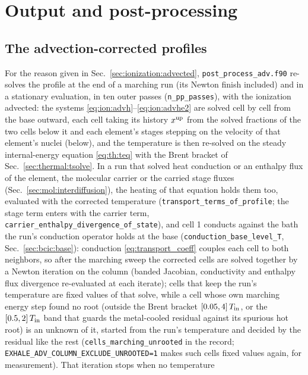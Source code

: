 \section{Output and post-processing}
\label{sec:postprocessing}

\subsection{The advection-corrected profiles}
\label{sec:postprocessing:adv}

For the reason given in Sec.~\ref{sec:ionization:advected},
\texttt{post\_process\_adv.f90} re-solves the profile at the end of a
marching run (its Newton finish included) and in a stationary evaluation,
in ten outer passes (\texttt{n\_pp\_passes}), with the ionization advected:
the systems \eqref{eq:ion:advh}--\eqref{eq:ion:advhe2} are solved cell by cell
from the base outward, each cell taking its history $x^{\rm up}$ from the
solved fractions of the two cells below it and each element's stages
stepping on the velocity of that element's nuclei (below), and the
temperature is then re-solved on the steady internal-energy equation
\eqref{eq:th:teq} with the Brent bracket of Sec.~\ref{sec:thermal:tsolve}.
In a run that solved heat conduction or an enthalpy flux of the element, the
molecular carrier or the carried stage fluxes
(Sec.~\ref{sec:mol:interdiffusion}), the heating of that equation holds them
too, evaluated with the corrected temperature
(\texttt{transport\_terms\_of\_profile}; the stage term enters with the
carrier term, \texttt{carrier\_enthalpy\_divergence\_of\_state}), and cell 1
conducts against the bath the run's conduction operator holds at the base
(\texttt{conduction\_base\_level\_T}, Sec.~\ref{sec:bcic:base}):
conduction \eqref{eq:transport_coeff} couples each cell to both
neighbors, so after the marching sweep the corrected cells are solved
together by a Newton iteration on the column (banded Jacobian, conductivity
and enthalpy flux divergence re-evaluated at each iterate); cells that keep
the run's temperature are fixed values of that solve, while a cell whose
own marching energy step found no root (outside the Brent bracket
$[0.05, 4]\,T_{\rm in}$, or the $[0.5, 2]\,T_{\rm in}$ band that guards the
metal-cooled residual against its spurious hot root) is an unknown of it,
started from the run's temperature and decided by the residual like the
rest (\texttt{cells\_marching\_unrooted} in the record;
\texttt{EXHALE\_ADV\_COLUMN\_EXCLUDE\_UNROOTED=1} makes such cells fixed
values again, for measurement).  That iteration stops when no temperature
